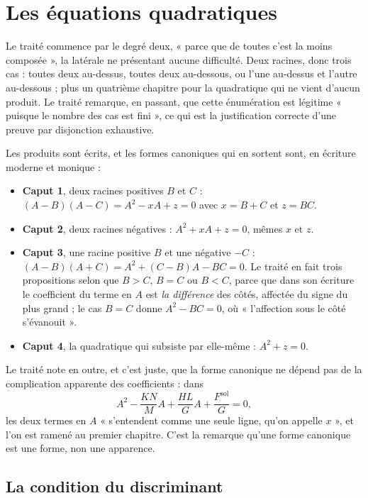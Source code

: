 \documentclass[11pt,a4paper]{article}
\begin{document}
\section*{Les équations quadratiques}

Le traité commence par le degré deux, « parce que de toutes c'est la moins
composée », la latérale ne présentant aucune difficulté. Deux racines, donc
trois cas : toutes deux au-dessus, toutes deux au-dessous, ou l'une au-dessus et
l'autre au-dessous ; plus un quatrième chapitre pour la quadratique qui ne vient
d'aucun produit. Le traité remarque, en passant, que cette énumération est
légitime « puisque le nombre des cas est fini », ce qui est la justification
correcte d'une preuve par disjonction exhaustive.

Les produits sont écrits, et les formes canoniques qui en sortent sont, en
écriture moderne et monique :

\begin{itemize}
  \item \textbf{Caput 1}, deux racines positives $B$ et $C$ :
    $(A-B)(A-C) = A^2 - xA + z = 0$ avec $x = B + C$ et $z = BC$.
  \item \textbf{Caput 2}, deux racines négatives : $A^2 + xA + z = 0$, mêmes
    $x$ et $z$.
  \item \textbf{Caput 3}, une racine positive $B$ et une négative $-C$ :
    $(A-B)(A+C) = A^2 + (C - B)A - BC = 0$. Le traité en fait trois
    propositions selon que $B > C$, $B = C$ ou $B < C$, parce que dans son
    écriture le coefficient du terme en $A$ est \emph{la différence} des côtés,
    affectée du signe du plus grand ; le cas $B = C$ donne
    $A^2 - BC = 0$, où « l'affection sous le côté s'évanouit ».
  \item \textbf{Caput 4}, la quadratique qui subsiste par elle-même :
    $A^2 + z = 0$.
\end{itemize}

Le traité note en outre, et c'est juste, que la forme canonique ne dépend pas de
la complication apparente des coefficients : dans
\[ A^2 - \frac{KN}{M}A + \frac{HL}{G}A + \frac{F^{\mathrm{sol}}}{G} = 0, \]
les deux termes en $A$ « s'entendent comme une seule ligne, qu'on appelle $x$ »,
et l'on est ramené au premier chapitre. C'est la remarque qu'une forme canonique
est une forme, non une apparence.

\subsection*{La condition du discriminant}
\end{document}
